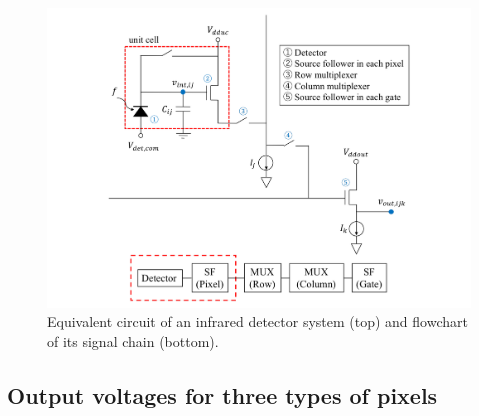 \documentclass{aastex62}
\begin{document}
\begin{figure}[H]
\begin{center}
\includegraphics[width=15cm]{equivalent_circuit.pdf}
\caption{Equivalent circuit of an infrared detector system (top) and flowchart of its signal chain (bottom). \label{fig:equivalent_circuit}}
\end{center}
\end{figure}


\subsection{Output voltages for three types of pixels} \label{subsec:three}
\end{document}
